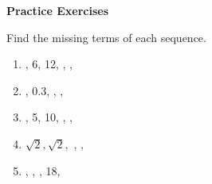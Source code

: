 \textbf{Practice Exercises}

\vspce

Find the missing terms of each sequence. 


\begin{enumerate}[label = \arabic*. ]

\item \hspce {}, 6, 12, \blank, \blank, \blank
\vspce
\item \hspce {}, 0.3, \blank, \blank, \blank 
\vspce
\item \hspce {}, 5, 10, \blank, \blank, \blank 
\vspce
\item \hspce \hspce $\sqrt{2}, \sqrt{2}, $ \blank, \blank, \blank 
\vspce
\item \hspce {}, \blank, \blank, 18, \blank 


\end{enumerate}


 




